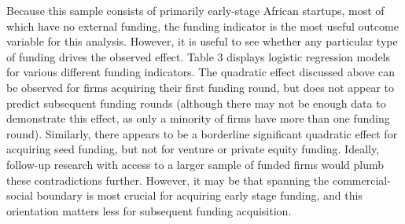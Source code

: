 \documentclass[12pt]{article}
\begin{document}
Because this sample consists of primarily early-stage African startups, most of which have no external funding, the funding indicator is the most useful outcome variable for this analysis. However, it is useful to see whether any particular type of funding drives the observed effect. Table 3 displays logistic regression models for various different funding indicators. The quadratic effect discussed above can be observed for firms acquiring their first funding round, but does not appear to predict subsequent funding rounds (although there may not be enough data to demonstrate this effect, as only a minority of firms have more than one funding round). Similarly, there appears to be a borderline significant quadratic effect for acquiring seed funding, but not for venture or private equity funding. Ideally, follow-up research with access to a larger sample of funded firms would plumb these contradictions further. However, it may be that spanning the commercial-social boundary is most crucial for acquiring early stage funding, and this orientation matters less for subsequent funding acquisition. 
\end{document}
